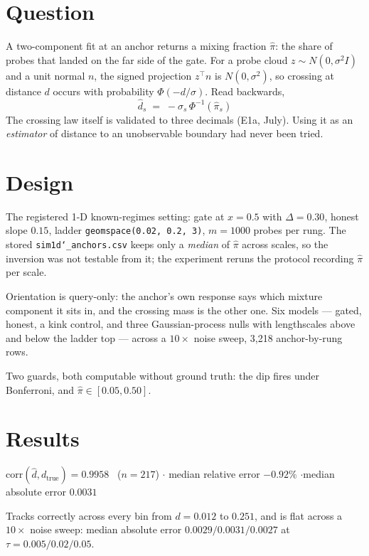 \documentclass[11pt]{article}
\newcommand{\dhat}{\hat{d}}
\newcommand{\pihat}{\hat{\pi}}
\begin{document}
\section{Question}

A two-component fit at an anchor returns a mixing fraction $\pihat$: the share of probes that
landed on the far side of the gate. For a probe cloud $z \sim N(0,\sigma^2 I)$ and a unit normal
$n$, the signed projection $z^\top n$ is $N(0,\sigma^2)$, so crossing at distance $d$ occurs with
probability $\Phi(-d/\sigma)$. Read backwards,
\[
  \boxed{\;\dhat_s \;=\; -\sigma_s\,\Phi^{-1}(\pihat_s)\;}
\]
The crossing law itself is validated to three decimals (E1a, July). Using it as an
\emph{estimator} of distance to an unobservable boundary had never been tried.

\section{Design}

The registered 1-D known-regimes setting: gate at $x = 0.5$ with $\Delta = 0.30$, honest slope
$0.15$, ladder \texttt{geomspace(0.02, 0.2, 3)}, $m = 1000$ probes per rung. The stored
\texttt{sim1d\char`_anchors.csv} keeps only a \emph{median} of $\pihat$ across scales, so the
inversion was not testable from it; the experiment reruns the protocol recording $\pihat$ per
scale.

Orientation is query-only: the anchor's own response says which mixture component it sits in,
and the crossing mass is the other one. Six models --- gated, honest, a kink control, and three
Gaussian-process nulls with lengthscales above and below the ladder top --- across a $10\times$
noise sweep, 3{,}218 anchor-by-rung rows.

Two guards, both computable without ground truth: the dip fires under Bonferroni, and
$\pihat \in [0.05, 0.50]$.

\section{Results}

\begin{resultbox}
\noindent $\mathrm{corr}(\dhat, d_{\text{true}}) = \mathbf{0.9958}$ \ ($n = 217$) \quad$\cdot$\quad
median relative error $\mathbf{-0.92\%}$ \quad$\cdot$\quad median absolute error $0.0031$

\smallskip
\noindent Tracks correctly across every bin from $d = 0.012$ to $0.251$, and is flat across a
$10\times$ noise sweep: median absolute error $0.0029 / 0.0031 / 0.0027$ at
$\tau = 0.005 / 0.02 / 0.05$.
\end{resultbox}
\end{document}
